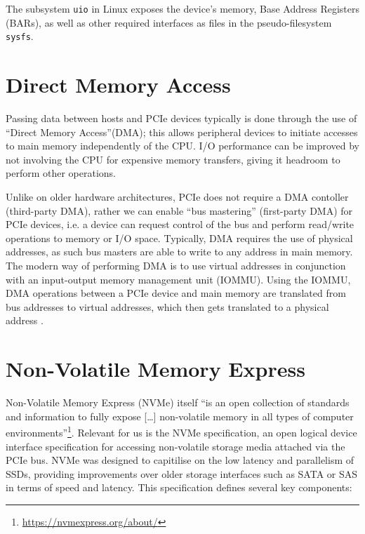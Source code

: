 The subsystem \texttt{uio} in Linux exposes the device's memory, Base Address Registers (BARs), as well as other required interfaces as files in the pseudo-filesystem \texttt{sysfs}.

\section{Direct Memory Access}
Passing data between hosts and PCIe devices typically is done through the use of ``Direct Memory Access''(DMA); this allows peripheral devices to initiate accesses to main memory independently of the CPU. I/O performance can be improved by not involving the CPU for expensive memory transfers, giving it headroom to perform other operations.

Unlike on older hardware architectures, PCIe does not require a DMA contoller (third-party DMA), rather we can enable ``bus mastering'' (first-party DMA) for PCIe devices, i.e. a device can request control of the bus and perform read/write operations to memory or I/O space. Typically, DMA requires the use of physical addresses, as such bus masters are able to write to any address in main memory. The modern way of performing DMA is to use virtual addresses in conjunction with an input-output memory management unit (IOMMU). Using the IOMMU, DMA operations between a PCIe device and main memory are translated from bus addresses to virtual addresses, which then gets translated to a physical address \cite{spdk-dma}.


\section{Non-Volatile Memory Express}
Non-Volatile Memory Express (NVMe) itself ``is an open collection of standards and information to fully expose [\ldots] non-volatile memory in all types of computer environments''\footnote{\url{https://nvmexpress.org/about/}}. Relevant for us is the NVMe specification, an open logical device interface specification for accessing non-volatile storage media attached via the PCIe bus. NVMe was designed to capitilise on the low latency and parallelism of SSDs, providing improvements over older storage interfaces such as SATA or SAS in terms of speed and latency. This specification defines several key components:

